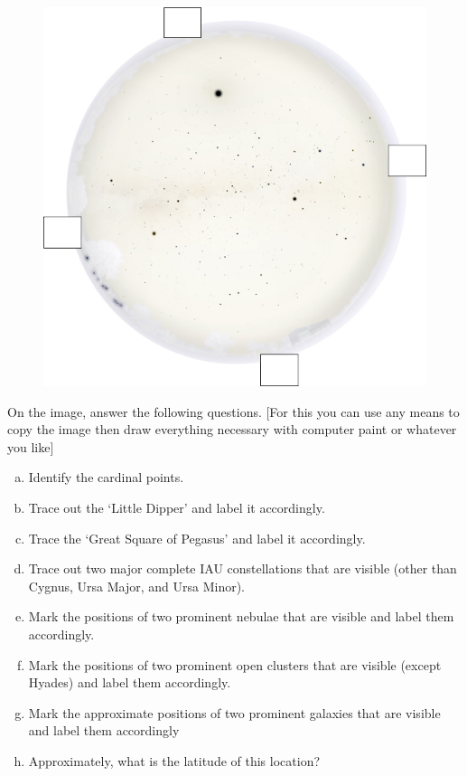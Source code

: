 \documentclass[a4paper,12pt]{extarticle}
\begin{document}
\begin{figure}[H]
    \centering
    \includegraphics[width=\linewidth]{BDOAA_2.png}
\end{figure}

 On the image, answer the following questions. [For this you can use any means to copy the image then draw everything necessary with computer paint or whatever you like]
\begin{enumerate}[a.]
    \item  Identify the cardinal points.
    \item Trace out the `Little Dipper' and label it accordingly.
    \item Trace the `Great Square of Pegasus' and label it accordingly.
    \item Trace out two major complete IAU constellations that are visible (other than Cygnus, Ursa Major, and Ursa Minor).
    \item Mark the positions of two prominent nebulae that are visible and label them accordingly.
    \item Mark the positions of two prominent open clusters that are visible (except Hyades) and label them accordingly.
    \item Mark the approximate positions of two prominent galaxies that are visible and label them accordingly 
    \item Approximately, what is the latitude of this location?
\end{enumerate}
\end{document}
